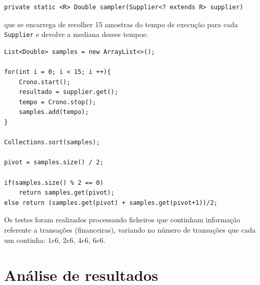 \documentclass{article}
\begin{document}
\begin{lstlisting}
private static <R> Double sampler(Supplier<? extends R> supplier)
\end{lstlisting}

que se encarrega de recolher 15 amostras do tempo de execução para cada \texttt{Supplier} e devolve a mediana desses tempos:

\begin{lstlisting}
List<Double> samples = new ArrayList<>(); 
    
for(int i = 0; i < 15; i ++){
    Crono.start();
    resultado = supplier.get();
    tempo = Crono.stop();
    samples.add(tempo);
}

Collections.sort(samples);

pivot = samples.size() / 2;

if(samples.size() % 2 == 0)
    return samples.get(pivot);
else return (samples.get(pivot) + samples.get(pivot+1))/2;
\end{lstlisting}

Os testes foram realizados processando ficheiros que continham informação referente a transações (financeiras), variando no número de transações que cada um continha: $1e6$, $2e6$, $4e6$, $6e6$.

\section{Análise de resultados}
\end{document}
